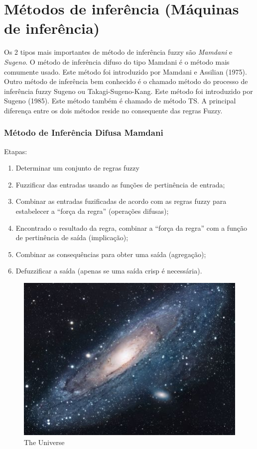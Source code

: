 \documentclass{article}
\begin{document}
\section{Métodos de inferência (Máquinas de inferência)}

Os 2 tipos mais importantes de método de inferência fuzzy
são \emph{Mamdani} e \emph{Sugeno}. O método de inferência 
difuso do tipo Mamdani é o método mais comumente usado. 
Este método foi introduzido por Mamdani e Assilian (1975). 
Outro método de inferência bem conhecido é o chamado método do processo de inferência fuzzy Sugeno ou Takagi-Sugeno-Kang. 
Este método foi introduzido por Sugeno (1985). Este método 
também é chamado de método TS. A principal diferença entre 
os dois métodos reside no consequente das regras Fuzzy.


\subsubsection{Método de Inferência Difusa Mamdani\citep{
ProfVolmirWilhelm}}

Etapas:

\begin{enumerate}
    \item  Determinar um conjunto de regras fuzzy
    \item  Fuzzificar das entradas usando as funções de pertinência de entrada;
    \item  Combinar as entradas fuzificadas de acordo com as regras fuzzy para
estabelecer a ``força da regra'' (operações difusas);
    \item  Encontrado o resultado da regra, combinar a ``força da regra'' com a função
de pertinência de saída (implicação);
    \item  Combinar as consequências para obter uma saída (agregação);
    \item  Defuzzificar a saída (apenas se uma saída crisp é necessária).
\end{enumerate}







\begin{figure}[h!]
\centering
\includegraphics[scale=1.7]{universe.jpg}
\caption{The Universe}
\label{fig:univerise}
\end{figure}
\end{document}

